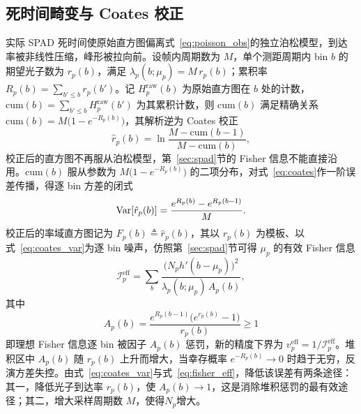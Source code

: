 \subsection{死时间畸变与 Coates 校正}
\label{sec:coates}

实际 SPAD 死时间使原始直方图偏离式~\eqref{eq:poisson_obs}的独立泊松模型，到达率被非线性压缩，峰形被拉向前。设帧内周期数为 $M$，单个测距周期内 bin $b$ 的期望光子数为 $r_p(b)$，满足 $\lambda_p(b;\mu_p)=M\,r_p(b)$；累积率 $R_p(b)=\sum_{b'\le b}r_p(b')$。记 $H_p^{\mathrm{raw}}(b)$ 为原始直方图在 $b$ 处的计数，$\mathrm{cum}(b)=\sum_{b'\le b}H_p^{\mathrm{raw}}(b')$ 为其累积计数，则 $\mathrm{cum}(b)$ 满足精确关系 $\mathrm{cum}(b)=M\big(1-e^{-R_p(b)}\big)$，其解析逆为 Coates 校正~\cite{Coates1968}
\begin{equation}
  \hat r_p(b)=\ln\frac{M-\mathrm{cum}(b-1)}{M-\mathrm{cum}(b)},
  \label{eq:coates}
\end{equation}
校正后的直方图不再服从泊松模型，第~\ref{sec:spad}节的 Fisher 信息不能直接沿用。$\mathrm{cum}(b)$ 服从参数为 $M\big(1-e^{-R_p(b)}\big)$ 的二项分布，对式~\eqref{eq:coates}作一阶误差传播，得逐 bin 方差的闭式
\begin{equation}
  \operatorname{Var}[\hat r_p(b)]=\frac{e^{R_p(b)}-e^{R_p(b-1)}}{M}.
  \label{eq:coates_var}
\end{equation}
校正后的率域直方图记为 $F_p(b)\triangleq\hat r_p(b)$，其以 $r_p(b)$ 为模板、以式~\eqref{eq:coates_var}为逐 bin 噪声，仿照第~\ref{sec:spad}节可得 $\mu_p$ 的有效 Fisher 信息
\begin{equation}
  \mathcal I_p^{\mathrm{eff}}
  =\sum_b\frac{\big(N_p h'(b-\mu_p)\big)^2}{\lambda_p(b;\mu_p)\,A_p(b)},
  \label{eq:fisher_eff}
\end{equation}
其中
\begin{equation}
  A_p(b)=\frac{e^{R_p(b-1)}\big(e^{r_p(b)}-1\big)}{r_p(b)}\ge 1
\end{equation}
即理想 Fisher 信息逐 bin 被因子 $A_p(b)$ 惩罚，新的精度下界为 $v_p^{\mathrm{eff}}=1/\mathcal I_p^{\mathrm{eff}}$。堆积区中 $A_p(b)$ 随 $r_p(b)$ 上升而增大，当幸存概率 $e^{-R_p(b)}\to0$ 时趋于无穷，反演方差失控。由式~\eqref{eq:coates_var}与式~\eqref{eq:fisher_eff}，降低该误差有两条途径：其一，降低光子到达率 $r_p(b)$，使 $A_p(b)\to1$，这是消除堆积惩罚的最有效途径；其二，增大采样周期数 $M$，使得$N_p$增大。
